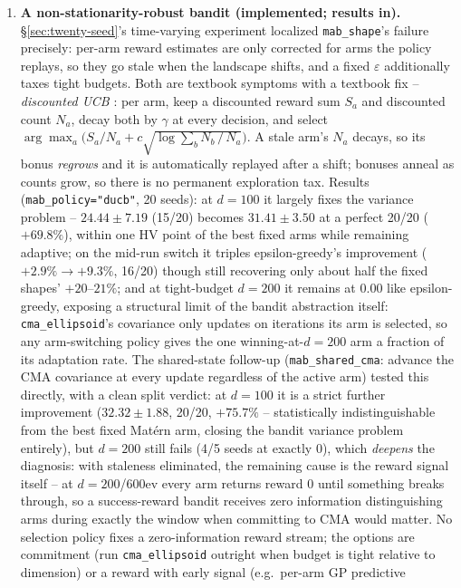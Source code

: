 \documentclass[11pt]{article}
\begin{document}
\begin{enumerate}
\item \textbf{A non-stationarity-robust bandit (implemented; results in).}
\S\ref{sec:twenty-seed}'s time-varying experiment localized
\texttt{mab\_shape}'s failure precisely: per-arm reward estimates are only
corrected for arms the policy replays, so they go stale when the landscape
shifts, and a fixed $\varepsilon$ additionally taxes tight budgets. Both
are textbook symptoms with a textbook fix -- \emph{discounted UCB}
\citep{garivier2011ducb}: per arm, keep a discounted reward sum $S_a$ and
discounted count $N_a$, decay both by $\gamma$ at every decision, and
select $\arg\max_a \big( S_a/N_a + c\sqrt{\log \sum_b N_b \,/\, N_a}
\big)$. A stale arm's $N_a$ decays, so its bonus \emph{regrows} and it is
automatically replayed after a shift; bonuses anneal as counts grow, so
there is no permanent exploration tax. Results
(\texttt{mab\_policy="ducb"}, 20 seeds): at $d{=}100$ it largely fixes
the variance problem -- $24.44 \pm 7.19$ (15/20) becomes
$\mathbf{31.41 \pm 3.50}$ at a perfect 20/20 ($+69.8\%$), within one HV
point of the best fixed arms while remaining adaptive; on the mid-run
switch it triples epsilon-greedy's improvement ($+2.9\% \to +9.3\%$,
16/20) though still recovering only about half the fixed shapes'
$+20$--$21\%$; and at tight-budget $d{=}200$ it remains at $0.00$ like
epsilon-greedy, exposing a structural limit of the bandit abstraction
itself: \texttt{cma\_ellipsoid}'s covariance only updates on iterations
its arm is selected, so any arm-switching policy gives the one
winning-at-$d{=}200$ arm a fraction of its adaptation rate. The
shared-state follow-up (\texttt{mab\_shared\_cma}: advance the CMA
covariance at every update regardless of the active arm) tested this
directly, with a clean split verdict: at $d{=}100$ it is a strict further
improvement ($32.32 \pm 1.88$, 20/20, $+75.7\%$ -- statistically
indistinguishable from the best fixed Mat\'ern arm, closing the bandit
variance problem entirely), but $d{=}200$ still fails (4/5 seeds at
exactly 0), which \emph{deepens} the diagnosis: with staleness eliminated,
the remaining cause is the reward signal itself -- at $d{=}200$/600ev
every arm returns reward 0 until something breaks through, so a
success-reward bandit receives zero information distinguishing arms during
exactly the window when committing to CMA would matter. No selection
policy fixes a zero-information reward stream; the options are commitment
(run \texttt{cma\_ellipsoid} outright when budget is tight relative to
dimension) or a reward with early signal (e.g.\ per-arm GP predictive

\end{enumerate}
\end{document}
